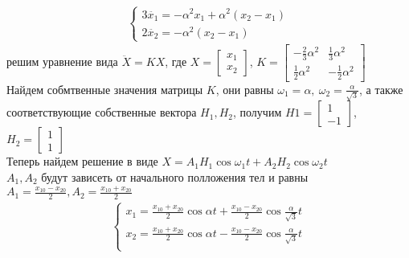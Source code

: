 \documentclass{article}
\begin{document}
\section{}
\label{sec:org4b338d7}
\begin{align*}
\begin{cases}
3\ddot{x_1} = - \alpha^2x_1 + \alpha^2(x_2 - x_1) \\
2\ddot{x_2} = - \alpha^2(x_2 - x_1)
\end{cases}
\end{align*}
решим уравнение вида \(\ddot{X} = KX\), где \(X = \begin{bmatrix} x_1 \\ x_2 \end{bmatrix}\), 
\(K = \begin{bmatrix}-\frac{2}{3}\alpha^2 & \frac{1}{3}\alpha^2 \\ \frac{1}{2}\alpha^2 & -\frac{1}{2}\alpha^2 \end{bmatrix}\) \\
Найдем собмтвенные значения матрицы \(K\), они равны \(\omega_1 = \alpha,\ \omega_2 = \frac{\alpha}{\sqrt{3}}\), 
а также соответствующие собственные вектора \(H_1, H_2\), получим \(H1 = \begin{bmatrix} 1 \\ -1 \end{bmatrix}\),
\(H_2 = \begin{bmatrix} 1 \\ 1 \end{bmatrix}\) \\
Теперь найдем решение в виде \(X = A_1 H_1\cos\omega_1 t + A_2 H_2 \cos\omega_2 t\) \\
\(A_1, A_2\) будут зависеть от начального полложения тел и равны \(A_1 = \frac{x_{10} - x_{20}}{2}, A_2 = \frac{x_{10} + x_{20}}{2}\) \\
\begin{align*}
\begin{cases}
x_1 = \frac{x_{10} + x_{20}}{2}\cos{\alpha t} + \frac{x_{10} - x_{20}}{2}\cos{\frac{\alpha}{\sqrt{3}} t} \\
x_2 = \frac{x_{10} + x_{20}}{2}\cos{\alpha t} - \frac{x_{10} - x_{20}}{2}\cos{\frac{\alpha}{\sqrt{3}} t} \\
\end{cases}
\end{align*}
\section{}
\label{sec:org97c29f7}
\end{document}
